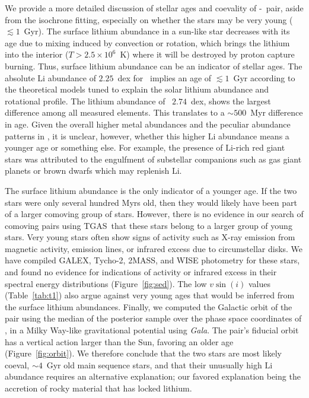 \documentclass[12pt,letterpaper,margin=1in]{article}
\newcommand{\project}[1]{\textsl{#1}}
\newcommand{\acronym}[1]{{\small{#1}}}
\newcommand{\figname}{Figure}
\newcommand{\tgas}{\acronym{TGAS}}
\newcommand*\elem[1]{\ensuremath{\mathrm{#1}}}
\newcommand{\sunanalog}{\text{Krios}}
\newcommand{\bizarreone}{\text{Kronos}}
\renewcommand\tablename{Table}
\begin{document}
We provide a more detailed discussion of stellar ages and coevality of
\bizarreone-\sunanalog\ pair, aside from the isochrone fitting,
especially on whether the stars may be very young ($\lesssim 1$~Gyr).
The surface lithium abundance in a sun-like star decreases with its age due to
mixing induced by convection or rotation, which brings the lithium into the
interior ($T>2.5 \times 10^{6}$~K) where it will be destroyed by proton capture
burning.
Thus, surface lithium abundance can be an indicator of stellar ages.
The absolute $\elem{Li}$ abundance of $2.25$~dex for \sunanalog\ implies an age
of $\lesssim 1$~Gyr according to the theoretical models tuned to explain the
solar lithium abundance and rotational profile\cite{2005Sci...309.2189C}.
The lithium abundance of \bizarreone\, $2.74$~dex, shows the largest difference
among all measured elements.
This translates to a $\sim 500$~Myr difference in age.
Given the overall higher metal abundances and the peculiar abundance patterns
in \bizarreone, it is unclear, however, whether this higher $\elem{Li}$
abundance means a younger age or something else.
For example, the presence of $\elem{Li}$-rich red giant stars was
attributed to the engulfment of substellar companions such as gas giant planets
or brown dwarfs which may replenish $\elem{Li}$\cite{Casey:2016aa}.

The surface lithium abundance is the only indicator of a
younger age.
If the two stars were only several hundred Myrs old, then they would likely
have been part of a larger comoving group of stars.
However, there is no evidence in our search\cite{2017AJ....153..257O} of
comoving pairs using \tgas\ that these stars belong to a larger group of
young stars.
Very young stars often show signs of activity such as
X-ray emission from magnetic activity, emission lines, or infrared excess due to
circumstellar disks.
We have compiled GALEX, Tycho-2, 2MASS, and WISE photometry for these stars, and
found no evidence for indications of activity or infrared excess in their
spectral energy distributions (\figname~\ref{fig:sed}).
The low $v\sin(i)$ values (\tablename~\ref{tab:t1}) also argue against very
young ages that would be inferred from the surface lithium abundances.
Finally, we computed the Galactic orbit of the pair using the median of the
posterior sample over the phase space coordinates of \sunanalog, in a Milky
Way-like gravitational potential\cite{Bovy:2015} using \project{Gala}\cite{gala}.
The pair's fiducial orbit has a vertical action larger than the Sun, favoring
an older age\cite{Wielen:1977,Aumer:2016} (\figname~\ref{fig:orbit}).
We therefore conclude that the two stars are most likely coeval, $\sim 4$~Gyr
old main sequence stars, and that their unusually high \elem{Li} abundance
requires an alternative explanation; our favored explanation being the accretion
of rocky material that has locked lithium.
\end{document}
